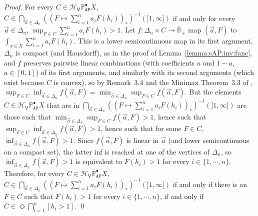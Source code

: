 \documentclass[preprint,12pt]{elsarticle}
\newcommand{\creal}{\overline{\mathbb{R}}_+}
\newcommand\Pred{\mathbb{P}}
\newcommand\Angel{{\mathtt{A}}}
\newcommand\Nature{{\mathtt{P}}}
\newcommand\AN{{\Angel\Nature}}
\newcommand\Hoare{{\mathcal H}}
\newcommand\Vt{\mathsf{V}}
\newcommand\HV{\Hoare_\Vt}
\begin{document}
\begin{proof}
  For every $C \in \HV {\Pred_\AN^\bullet X}$,
  $C \in \bigcap_{\vec a \in \Delta_n} \left(\left(F \mapsto
      \sum_{i=1}^n a_i F (h_i)\right)_*\right)^{-1} (]1, \infty])$ if
  and only for every $\vec a \in \Delta_n$,
  $\sup_{F \in C} \sum_{i=1}^n a_i F (h_i) > 1$.  Let
  $f \colon \Delta_n \times C \to \creal$ map $(\vec a, F)$ to
  $\int_{x \in X} \sum_{i=1}^n a_i F (h_i)$.  This is a lower
  semicontinuous map in its first argument, $\Delta_n$ is compact (and
  Hausdorff), as in the proof of Lemma~\ref{lemma:sAP:inv:func}, and
  $f$ preserves pairwise linear combinations (with coefficients $a$
  and $1-a$, $a \in [0, 1]$) of its first arguments, and similarly
  with its second arguments (which exist because $C$ is convex), so by
  Remark~3.4 and the Minimax Theorem~3.3 of \cite{JGL-minimax17},
  $\sup_{F \in C} \inf_{\vec a \in \Delta_n} f (\vec a, F) =
  \min_{\vec a \in \Delta_n} \sup_{F \in C} f (\vec a, F)$.  But the
  elements $C \in \HV {\Pred_\AN^\bullet X}$ that are in
  $\bigcap_{\vec a \in \Delta_n} \left(\left(F \mapsto \sum_{i=1}^n
      a_i F (h_i)\right)_*\right)^{-1} (]1, \infty])$ are those such
  that $\min_{\vec a \in \Delta_n} \sup_{F \in C} f (\vec a, F) > 1$,
  hence such that
  $\sup_{F \in C} \inf_{\vec a \in \Delta_n} f (\vec a, F) > 1$, hence
  such that for some $F \in C$,
  $\inf_{\vec a \in \Delta_n} f (\vec a, F) > 1$.  Since
  $f (\vec a, F)$ is linear in $\vec a$ (and lower semicontinuous on a
  compact set), the latter inf is reached at one of the vertices of
  $\Delta_n$, so $\inf_{\vec a \in \Delta_n} f (\vec a, F) > 1$ is
  equivalent to $F (h_i) > 1$ for every $i \in \{1, \cdots, n\}$.
  Therefore, for every $C \in \HV {\Pred_\AN^\bullet X}$,
  $C \in \bigcap_{\vec a \in \Delta_n} \left(\left(F \mapsto
      \sum_{i=1}^n a_i F (h_i)\right)_*\right)^{-1} (]1, \infty])$ if
  and only if there is an $F \in C$ such that $F (h_i) > 1$ for every
  $i \in \{1, \cdots, n\}$, if and only if
  $C \in \Diamond {\bigcap_{i=1}^n [h_i > 1]}$.  \qed
\end{proof}
\end{document}
